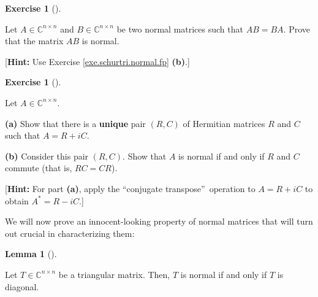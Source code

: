 \documentclass[numbers=enddot,12pt,final,onecolumn,notitlepage]{scrartcl}%
\newcounter{exer}
\numberwithin{exer}{subsection}
\theoremstyle{definition}
\newtheorem{lem}[theo]{Lemma}
\newenvironment{lemma}[1][]
{\begin{lem}[#1]\begin{leftbar}}
{\end{leftbar}\end{lem}}
\newtheorem{exmp}[exer]{Exercise}
\newenvironment{exercise}[1][]
{\begin{exmp}[#1]\begin{leftbar}}
{\end{leftbar}\end{exmp}}
\begin{document}
\begin{exercise}
 Let $A\in\mathbb{C}^{n\times n}$ and $B\in\mathbb{C}^{n\times n}$ be
two normal matrices such that $AB=BA$. Prove that the matrix $AB$ is normal.
\medskip

[\textbf{Hint:} Use Exercise \ref{exe.schurtri.normal.fp} \textbf{(b)}.]
\end{exercise}

\begin{exercise}
 Let $A\in\mathbb{C}^{n\times n}$. \medskip

\textbf{(a)} Show that there is a \textbf{unique} pair $\left(  R,C\right)  $
of Hermitian matrices $R$ and $C$ such that $A=R+iC$. \medskip

\textbf{(b)} Consider this pair $\left(  R,C\right)  $. Show that $A$ is
normal if and only if $R$ and $C$ commute (that is, $RC=CR$). \medskip

[\textbf{Hint:} For part \textbf{(a)}, apply the \textquotedblleft conjugate
transpose\textquotedblright\ operation to $A=R+iC$ to obtain $A^{\ast}=R-iC$.]
\end{exercise}

We will now prove an innocent-looking property of normal matrices that will
turn out crucial in characterizing them:

\begin{lemma}
\label{lem.schurtri.normal.tri}Let $T\in\mathbb{C}^{n\times n}$ be a
triangular matrix. Then, $T$ is normal if and only if $T$ is diagonal.
\end{lemma}
\end{document}

